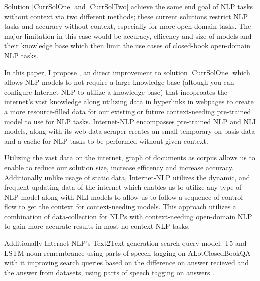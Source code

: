 Solution \ref{CurrSolOne} and \ref{CurrSolTwo} achieve the same end goal of NLP tasks without context via two different methods; these current solutions restrict NLP tasks and accuracy without context, especially for more open-domain tasks. The major limitation in this case would be accuracy, efficency and size of models and their knowledge base which then limit the use cases of closed-book open-domain NLP tasks.

In this paper, I propose \inlp, an direct improvement to solution \ref{CurrSolOne} which allows NLP models to not require a large knowledge base (altough you can configure Internet-NLP to utilize a knowledge base) that incoproates the internet's vast knowledge along utilizing data in hyperlinks in webpages \cite{https://doi.org/10.48550/arxiv.2203.15827} to create a more resource-filled data for our existing or future context-needing pre-trained model to use for NLP tasks. Internet-NLP encompasses pre-trained NLP and NLI models, along with its web-data-scraper creates an small temporary on-basis data and a cache for NLP tasks to be performed without given context.

Utilizing the vast data on the internet, graph of documents as corpus \cite{https://doi.org/10.48550/arxiv.2203.15827} allows us to enable to reduce our solution size, increase efficency and increase accuracy. Additionally unlike usage of static data, Internet-NLP utilizes the dynamic, and frequent updating data of the internet which enables us to utilize any type of NLP model along with NLI models to allow us to follow a sequence of control flow to get the context for context-needing models. This approach utilizes a combination of data-collection \cite{inbook} for NLPs with context-needing open-domain NLP to gain more accurate results in most no-context NLP tasks.

Additionally Internet-NLP's Text2Text-generation search query model: T5 \cite{https://doi.org/10.48550/arxiv.1910.10683} and LSTM noun remembrance using parts of speech tagging \cite{Chiche2022} on ALotClosedBookQA with it improving search queries based on the difference on answer recieved and the answer from datasets, using parts of speech tagging on answers \cite{Chiche2022}.
